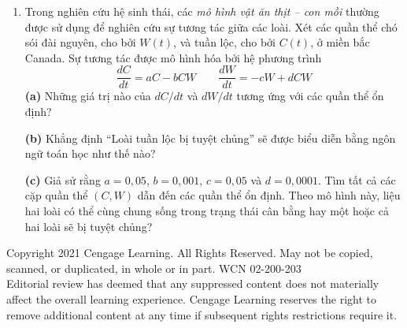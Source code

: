 \begin{minipage}[t]{0.485\textwidth}
\begin{enumerate}[label=\textbf{\arabic*.},leftmargin=1.6em,labelsep=0.4em,itemsep=6pt,topsep=5pt,parsep=1.5pt]
  \item Trong nghiên cứu hệ sinh thái, các \textit{mô hình vật ăn thịt -- con mồi} thường được sử dụng để nghiên cứu sự tương tác giữa các loài. Xét các quần thể chó sói đài nguyên, cho bởi $W(t)$, và tuần lộc, cho bởi $C(t)$, ở miền bắc Canada. Sự tương tác được mô hình hóa bởi hệ phương trình
  \[
  \frac{dC}{dt} = aC - bCW \qquad \frac{dW}{dt} = -cW + dCW
  \]
  \textbf{(a)} Những giá trị nào của $dC/dt$ và $dW/dt$ tương ứng với các quần thể ổn định?\par
  \textbf{(b)} Khẳng định “Loài tuần lộc bị tuyệt chủng” sẽ được biểu diễn bằng ngôn ngữ toán học như thế nào?\par
  \textbf{(c)} Giả sử rằng $a = 0{,}05$, $b = 0{,}001$, $c = 0{,}05$ và $d = 0{,}0001$. Tìm tất cả các cặp quần thể $(C, W)$ dẫn đến các quần thể ổn định. Theo mô hình này, liệu hai loài có thể cùng chung sống trong trạng thái cân bằng hay một hoặc cả hai loài sẽ bị tuyệt chủng?
\end{enumerate}
\end{minipage}

\vfill
\begin{center}
{\fontsize{6.5pt}{8pt}\selectfont\color{black!70}
Copyright 2021 Cengage Learning. All Rights Reserved. May not be copied, scanned, or duplicated, in whole or in part. WCN 02-200-203\\
Editorial review has deemed that any suppressed content does not materially affect the overall learning experience. Cengage Learning reserves the right to remove additional content at any time if subsequent rights restrictions require it.
}
\end{center}
